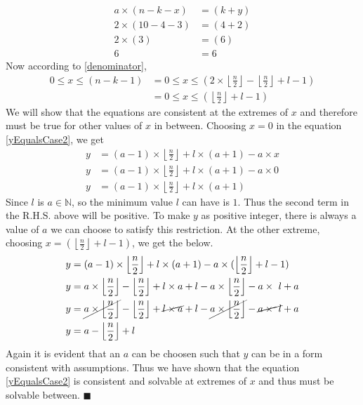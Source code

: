 \documentclass[10pt, twoside]{article}
\newcommand{\floordivision}[2]{\left\lfloor \frac{#1}{#2} \right\rfloor}
\begin{document}
\begin{align}
	a \times (n-k-x) &= (k+y) \nonumber \\
	2 \times (10-4-3) &= (4+2) \nonumber \\
	2 \times (3) &= (6) \nonumber \\
	6 &= 6 \nonumber
\end{align}
Now according to \eqref{denominator}, 
\begin{align}
	0 \leq x \leq (n-k-1) &= 0 \leq x \leq (2\times \floordivision{n}{2}-\floordivision{n}{2}+l-1) \nonumber \\
	&= 0 \leq x \leq (\floordivision{n}{2}+l-1) \label{LimitOfXforYEqualsCase2}
\end{align}
We will show that the equations are consistent at the extremes of $x$ and therefore must be true for other values of $x$ in between.\newline
Choosing $x=0$ in the equation \eqref{yEqualsCase2}, we get
\begin{align*}
	y &= (a-1)\times \floordivision{n}{2} + l \times (a+1) - a\times x \\
	y &= (a-1)\times \floordivision{n}{2} + l \times (a+1) - a\times 0 \\
	y &= (a-1)\times \floordivision{n}{2} + l \times (a+1)
\end{align*}
Since $l$ is $a \in \mathbb{N}$, so the minimum value $l$ can have is $1$. Thus the second term in the R.H.S. above will be positive. To make $y$ as positive integer, there is always a value of $a$ we can choose to satisfy this restriction.\newline
At the other extreme, choosing $x=(\floordivision{n}{2}+l-1)$, we get the below.
\begin{align*}
	y &= (a-1)\times \floordivision{n}{2} + l \times (a+1) - a\times (\floordivision{n}{2}+l-1) \\
	y &= a\times \floordivision{n}{2} - \floordivision{n}{2} +l\times a +l -a\times \floordivision{n}{2}-a\times\ l + a \\
	y &= \cancel{a\times \floordivision{n}{2}} - \floordivision{n}{2} +\cancel{l\times a} +l -\cancel{a\times \floordivision{n}{2}}-\cancel{a\times\ l} + a \\
	y &= a - \floordivision{n}{2} + l 
\end{align*}
Again it is evident that an $a$ can be choosen such that $y$ can be in a form consistent with assumptions. Thus we have shown that the equation \eqref{yEqualsCase2} is consistent and solvable at extremes of $x$ and thus must be solvable between. $\blacksquare$
\end{document}
